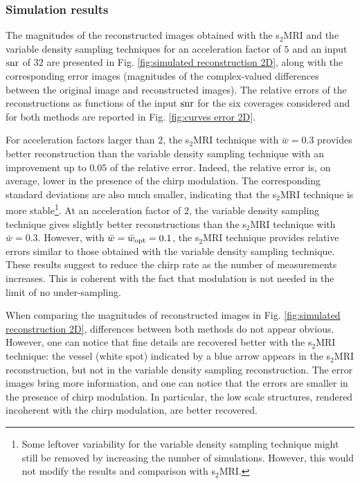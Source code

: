 \documentclass[10pt,draftcls, onecolumn]{IEEEtran}
\begin{document}
\subsubsection{Simulation results}

The magnitudes of the reconstructed images obtained with the s$_2$MRI and the variable density sampling techniques for an acceleration factor of $5$ and an input $\rm snr$ of $32$ are presented in Fig. \ref{fig:simulated reconstruction 2D}, along with the corresponding error images (magnitudes of the complex-valued differences between the original image and reconstructed images). The relative errors of the reconstructions as functions of the input ${\rm snr}$ for the six coverages considered and for both methods are reported in Fig. \ref{fig:curves error 2D}. 

For acceleration factors larger than $2$, the s$_2$MRI technique with $\bar{w} = 0.3$ provides better reconstruction than the variable density sampling technique with an improvement up to $0.05$ of the relative error. Indeed, the relative error is, on average, lower in the presence of the chirp modulation. The corresponding standard deviations are also much smaller, indicating that the s$_2$MRI technique is more stable\footnote{Some leftover variability for the variable density sampling technique might still be removed by increasing the number of simulations. However, this would not modify the results and comparison with s$_2$MRI.}. At an acceleration factor of $2$, the variable density sampling technique gives slightly better reconstructions than the s$_2$MRI technique with $\bar{w} = 0.3$. However, with $\bar{w} = \bar{w}_{\rm opt}=0.1$, the s$_2$MRI technique provides relative errors similar to those obtained with the variable density sampling technique. These results suggest to reduce the chirp rate as the number of measurements increases. This is coherent with the fact that modulation is not needed in the limit of no under-sampling.

When comparing the magnitudes of reconstructed images in Fig. \ref{fig:simulated reconstruction 2D}, differences between both methods do not appear obvious. However, one can notice that fine details are recovered better with the s$_2$MRI technique: the vessel (white spot) indicated by a blue arrow appears in the s$_2$MRI reconstruction, but not in the variable density sampling reconstruction. The error images bring more information, and one can notice that the errors are smaller in the presence of chirp modulation. In particular, the low scale structures, rendered incoherent with the chirp modulation, are better recovered.
\end{document}

